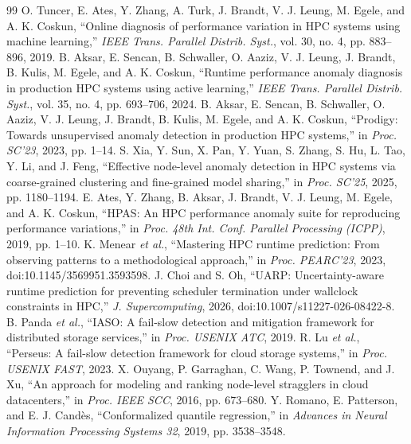 \documentclass[10pt,a4paper]{article}
\begin{document}
\renewcommand{\refname}{References}
\small
\begin{thebibliography}{99}
\setlength{\itemsep}{1pt}
 O. Tuncer, E. Ates, Y. Zhang, A. Turk, J. Brandt, V. J. Leung, M. Egele, and A. K. Coskun, ``Online diagnosis of performance variation in HPC systems using machine learning,'' \emph{IEEE Trans. Parallel Distrib. Syst.}, vol. 30, no. 4, pp. 883--896, 2019.
 B. Aksar, E. Sencan, B. Schwaller, O. Aaziz, V. J. Leung, J. Brandt, B. Kulis, M. Egele, and A. K. Coskun, ``Runtime performance anomaly diagnosis in production HPC systems using active learning,'' \emph{IEEE Trans. Parallel Distrib. Syst.}, vol. 35, no. 4, pp. 693--706, 2024.
 B. Aksar, E. Sencan, B. Schwaller, O. Aaziz, V. J. Leung, J. Brandt, B. Kulis, M. Egele, and A. K. Coskun, ``Prodigy: Towards unsupervised anomaly detection in production HPC systems,'' in \emph{Proc. SC'23}, 2023, pp. 1--14.
 S. Xia, Y. Sun, X. Pan, Y. Yuan, S. Zhang, S. Hu, L. Tao, Y. Li, and J. Feng, ``Effective node-level anomaly detection in HPC systems via coarse-grained clustering and fine-grained model sharing,'' in \emph{Proc. SC'25}, 2025, pp. 1180--1194.
 E. Ates, Y. Zhang, B. Aksar, J. Brandt, V. J. Leung, M. Egele, and A. K. Coskun, ``HPAS: An HPC performance anomaly suite for reproducing performance variations,'' in \emph{Proc. 48th Int. Conf. Parallel Processing (ICPP)}, 2019, pp. 1--10.
 K. Menear \emph{et al.}, ``Mastering HPC runtime prediction: From observing patterns to a methodological approach,'' in \emph{Proc. PEARC'23}, 2023, doi:10.1145/3569951.3593598.
 J. Choi and S. Oh, ``UARP: Uncertainty-aware runtime prediction for preventing scheduler termination under wallclock constraints in HPC,'' \emph{J. Supercomputing}, 2026, doi:10.1007/s11227-026-08422-8.
 B. Panda \emph{et al.}, ``IASO: A fail-slow detection and mitigation framework for distributed storage services,'' in \emph{Proc. USENIX ATC}, 2019.
 R. Lu \emph{et al.}, ``Perseus: A fail-slow detection framework for cloud storage systems,'' in \emph{Proc. USENIX FAST}, 2023.
 X. Ouyang, P. Garraghan, C. Wang, P. Townend, and J. Xu, ``An approach for modeling and ranking node-level stragglers in cloud datacenters,'' in \emph{Proc. IEEE SCC}, 2016, pp. 673--680.
 Y. Romano, E. Patterson, and E. J. Cand\`es, ``Conformalized quantile regression,'' in \emph{Advances in Neural Information Processing Systems 32}, 2019, pp. 3538--3548.

\end{thebibliography}
\end{document}
